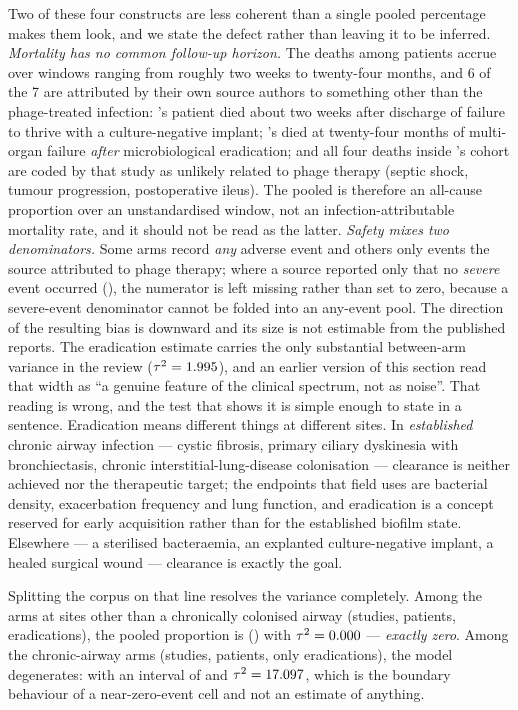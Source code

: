 Two of these four constructs are less coherent than a single pooled percentage makes them look, and we state the defect rather than leaving it to be inferred. \emph{Mortality has no common follow-up horizon.} The \MortOverallEvents deaths among \MortOverallN patients accrue over windows ranging from roughly two weeks to twenty-four months, and 6 of the 7 are attributed by their own source authors to something other than the phage-treated infection: \textcite{Ngauy2026_asmcr}'s patient died about two weeks after discharge of failure to thrive with a culture-negative implant; \textcite{Leveque2023_idr}'s died at twenty-four months of multi-organ failure \emph{after} microbiological eradication; and all four deaths inside \citeauthor{Pirnay2024_natmicrobiol}'s cohort are coded by that study as unlikely related to phage therapy (septic shock, tumour progression, postoperative ileus). The pooled \MortOverallEst is therefore an all-cause proportion over an unstandardised window, not an infection-attributable mortality rate, and it should not be read as the latter. \emph{Safety mixes two denominators.} Some arms record \emph{any} adverse event and others only events the source attributed to phage therapy; where a source reported only that no \emph{severe} event occurred (\textcite{Cesta2023_ofid}), the numerator is left missing rather than set to zero, because a severe-event denominator cannot be folded into an any-event pool. The direction of the resulting bias is downward and its size is not estimable from the published reports. The eradication estimate carries the only substantial between-arm variance in the review ($\tau^2 = 1.995 $), and an earlier version of this section read that width as ``a genuine feature of the clinical spectrum, not as noise''. That reading is wrong, and the test that shows it is simple enough to state in a sentence. Eradication means different things at different sites. In \emph{established} chronic airway infection --- cystic fibrosis, primary ciliary dyskinesia with bronchiectasis, chronic interstitial-lung-disease colonisation --- clearance is neither achieved nor the therapeutic target; the endpoints that field uses are bacterial density, exacerbation frequency and lung function, and eradication is a concept reserved for early acquisition rather than for the established biofilm state. Elsewhere --- a sterilised bacteraemia, an explanted culture-negative implant, a healed surgical wound --- clearance is exactly the goal.

Splitting the corpus on that line resolves the variance completely. Among the \EradOtherArms arms at sites other than a chronically colonised airway (\EradOtherK studies, \EradOtherN patients, \EradOtherEvents eradications), the pooled proportion is \EradOtherEst (\EradOtherCI ) with $\tau^2 = 0.000 $ --- \emph{exactly zero}. Among the \EradAirArms chronic-airway arms (\EradAirK studies, \EradAirN patients, only \EradAirEvents eradications), the model degenerates: \EradAirEst with an interval of \EradAirCI and $\tau^2 = 17.097 $, which is the boundary behaviour of a near-zero-event cell and not an estimate of anything.

